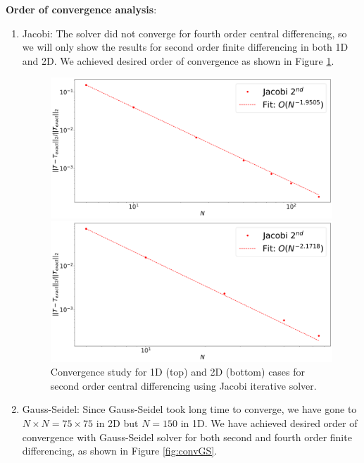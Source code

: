 \documentclass[12pt]{amsart}   %
\begin{document}
\textbf{Order of convergence analysis}:
\begin{enumerate}
    \item Jacobi: The solver did not converge for fourth order central differencing, so we will only show the results for second order finite differencing in both 1D and 2D. We achieved desired order of convergence as shown in Figure \ref{fig:convjacobi}.
    
\begin{figure}[htbp!] 
\begin{minipage}[]{\linewidth}
  \centering
    \includegraphics[width=\linewidth,keepaspectratio]{Project1photos/convergence_study_Jacobi_1D.png}
\end{minipage}
\begin{minipage}[htbp!]{\linewidth}
  \centering
    \includegraphics[width=\linewidth,keepaspectratio, trim = 0cm 0cm 0cm 0cm,clip]{Project1photos/convergence_study_Jacobi_2D.png}
\end{minipage}
\caption{Convergence study for 1D (top) and 2D (bottom) cases for second order central differencing using Jacobi iterative solver.} \label{fig:convjacobi}
\end{figure}
    \item Gauss-Seidel: Since Gauss-Seidel took long time to converge, we have gone to $N \times N =75 \times 75$ in 2D but $N = 150$ in 1D. We have achieved desired order of convergence with Gauss-Seidel solver for both second and fourth order finite differencing, as shown in Figure \ref{fig:convGS}.
    

\end{enumerate}
\end{document}
